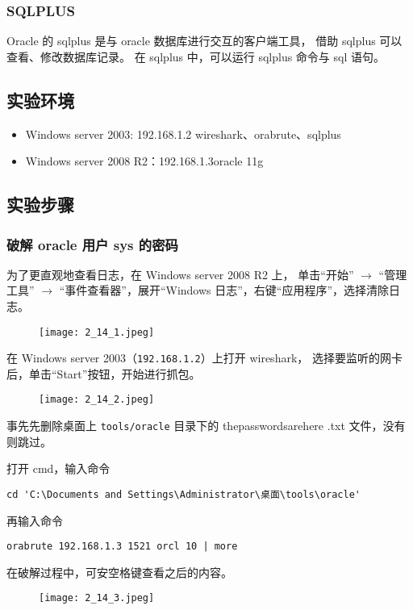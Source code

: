 \subsubsection{SQLPLUS}
Oracle 的 sqlplus 是与 oracle 数据库进行交互的客户端工具，
借助 sqlplus 可以查看、修改数据库记录。
在 sqlplus 中，可以运行 sqlplus 命令与 sql 语句。
%
\subsection{实验环境}
\begin{itemize}
  \item Windows server 2003: 192.168.1.2 wireshark、orabrute、sqlplus
  \item Windows server 2008 R2：192.168.1.3oracle 11g
\end{itemize}
%
\subsection{实验步骤}
\subsubsection{破解 oracle 用户 sys 的密码}
为了更直观地查看日志，在 Windows server 2008 R2 上，
单击``开始'' $ \rightarrow $ ``管理工具'' $ \rightarrow $
``事件查看器''，展开``Windows 日志''，右键``应用程序''，选择清除日志。
\begin{figure}[H]
  \begin{center}
    \texttt{[image: 2\_14\_1.jpeg]}
  \end{center}
\end{figure}

在 Windows server 2003（\texttt{192.168.1.2}）上打开 wireshark，
选择要监听的网卡后，单击``Start''按钮，开始进行抓包。
\begin{figure}[H]
  \begin{center}
    \texttt{[image: 2\_14\_2.jpeg]}
  \end{center}
\end{figure}

事先先删除桌面上 \texttt{tools/oracle} 目录下的
thepasswordsarehere .txt 文件，没有则跳过。

打开 cmd，输入命令
\begin{verbatim}
cd 'C:\Documents and Settings\Administrator\桌面\tools\oracle'
\end{verbatim}
再输入命令
\begin{verbatim}
orabrute 192.168.1.3 1521 orcl 10 | more
\end{verbatim}
在破解过程中，可安空格键查看之后的内容。
\begin{figure}[H]
  \begin{center}
    \texttt{[image: 2\_14\_3.jpeg]}
  \end{center}
\end{figure}

